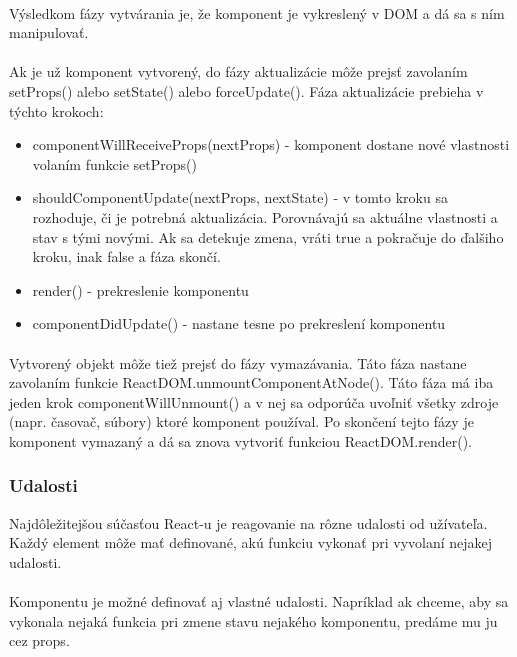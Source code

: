 \paragraph{}
Výsledkom fázy vytvárania je, že komponent je vykreslený v DOM a dá sa s ním manipulovať.
\paragraph{}
Ak je už komponent vytvorený, do fázy aktualizácie môže prejsť zavolaním setProps() alebo setState() alebo forceUpdate(). Fáza aktualizácie prebieha v týchto krokoch:
\begin{itemize}
	\item componentWillReceiveProps(nextProps) - komponent dostane nové vlastnosti volaním funkcie setProps()
	\item shouldComponentUpdate(nextProps, nextState) - v tomto kroku sa rozhoduje, či je potrebná aktualizácia. Porovnávajú sa aktuálne vlastnosti a stav s tými novými. Ak sa detekuje zmena, vráti true a pokračuje do ďalšiho kroku, inak false a fáza skončí.
	\item render() - prekreslenie komponentu
	\item componentDidUpdate() - nastane tesne po prekreslení komponentu
\end{itemize}
\paragraph{}
Vytvorený objekt môže tiež prejsť do fázy vymazávania. Táto fáza nastane zavolaním funkcie ReactDOM.unmountComponentAtNode(). Táto fáza má iba jeden krok componentWillUnmount() a v nej sa odporúča uvoľniť všetky zdroje (napr. časovač, súbory) ktoré komponent používal. Po skončení tejto fázy je komponent vymazaný a dá sa znova vytvoriť funkciou ReactDOM.render().



\subsubsection{Udalosti}
Najdôležitejšou súčasťou React-u je reagovanie na rôzne udalosti od užívateľa. Každý element môže mať definované, akú funkciu vykonať pri vyvolaní nejakej udalosti. 
\paragraph{}
Komponentu je možné definovať aj vlastné udalosti. Napríklad ak chceme, aby sa vykonala nejaká funkcia pri zmene stavu nejakého komponentu, predáme mu ju cez props.
